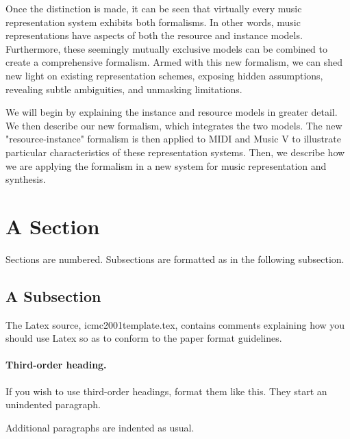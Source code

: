 \documentclass[10pt,a4paper]{article}
\begin{document}
Once the distinction is made, it can be seen that virtually every
music representation system exhibits both formalisms.  In other words,
music representations have aspects of both the resource and instance
models. Furthermore, these seemingly mutually exclusive models can be
combined to create a comprehensive formalism.  Armed with this new
formalism, we can shed new light on existing representation schemes,
exposing hidden assumptions, revealing subtle ambiguities, and
unmasking limitations.

We will begin by explaining the instance and resource models in
greater detail. We then describe our new formalism, which integrates
the two models. The new "resource-instance" formalism is then applied
to MIDI and Music V to illustrate particular characteristics of these
representation systems.  Then, we describe how we are applying the
formalism in a new system for music representation and synthesis.

\section{A Section}

Sections are numbered.  Subsections are formatted as in the following
subsection.

\subsection{A Subsection}

The Latex source, \textsf{icmc2001template.tex}, contains comments
explaining how you should use Latex so as to conform to the paper
format guidelines.

\paragraph{Third-order heading.}
If you wish to use third-order headings, format them like this.  They
start an unindented paragraph.

Additional paragraphs are indented as usual.
\end{document}
